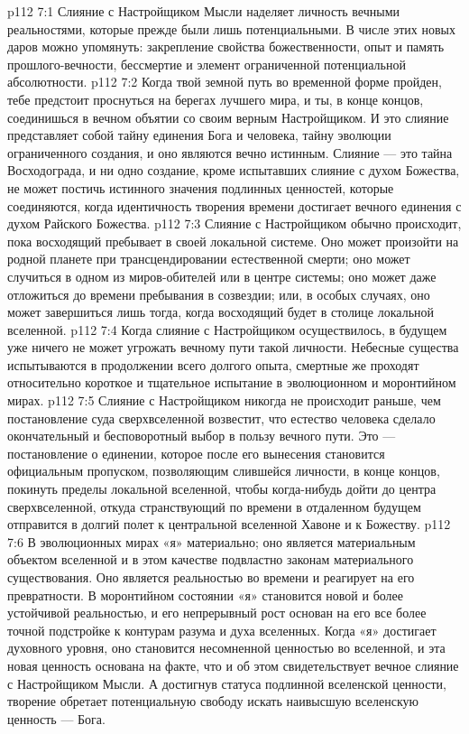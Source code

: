 \vs p112 7:1 Слияние с Настройщиком Мысли наделяет личность вечными реальностями, которые прежде были лишь потенциальными. В числе этих новых даров можно упомянуть: закрепление свойства божественности, опыт и память прошлого\hyp{}вечности, бессмертие и элемент ограниченной потенциальной абсолютности.
\vs p112 7:2 \pc Когда твой земной путь во временной форме пройден, тебе предстоит проснуться на берегах лучшего мира, и ты, в конце концов, соединишься в вечном объятии со своим верным Настройщиком. И это слияние представляет собой тайну единения Бога и человека, тайну эволюции ограниченного создания, и оно являются вечно истинным. Слияние --- это тайна Восходограда, и ни одно создание, кроме испытавших слияние с духом Божества, не может постичь истинного значения подлинных ценностей, которые соединяются, когда идентичность творения времени достигает вечного единения с духом Райского Божества.
\vs p112 7:3 Слияние с Настройщиком обычно происходит, пока восходящий пребывает в своей локальной системе. Оно может произойти на родной планете при трансцендировании естественной смерти; оно может случиться в одном из миров\hyp{}обителей или в центре системы; оно может даже отложиться до времени пребывания в созвездии; или, в особых случаях, оно может завершиться лишь тогда, когда восходящий будет в столице локальной вселенной.
\vs p112 7:4 Когда слияние с Настройщиком осуществилось, в будущем уже ничего не может угрожать вечному пути такой личности. Небесные существа испытываются в продолжении всего долгого опыта, смертные же проходят относительно короткое и тщательное испытание в эволюционном и моронтийном мирах.
\vs p112 7:5 Слияние с Настройщиком никогда не происходит раньше, чем постановление суда сверхвселенной возвестит, что естество человека сделало окончательный и бесповоротный выбор в пользу вечного пути. Это --- постановление о единении, которое после его вынесения становится официальным пропуском, позволяющим слившейся личности, в конце концов, покинуть пределы локальной вселенной, чтобы когда\hyp{}нибудь дойти до центра сверхвселенной, откуда странствующий по времени в отдаленном будущем отправится в долгий полет к центральной вселенной Хавоне и к Божеству.
\vs p112 7:6 \pc В эволюционных мирах «я» материально; оно является материальным объектом вселенной и в этом качестве подвластно законам материального существования. Оно является реальностью во времени и реагирует на его превратности.  В моронтийном состоянии «я» становится новой и более устойчивой реальностью, и его непрерывный рост основан на его все более точной подстройке к контурам разума и духа вселенных.  Когда «я» достигает духовного уровня, оно становится несомненной ценностью во вселенной, и эта новая ценность основана на факте, что  и об этом свидетельствует вечное слияние с Настройщиком Мысли. А достигнув статуса подлинной вселенской ценности, творение обретает потенциальную свободу искать наивысшую вселенскую ценность --- Бога.
